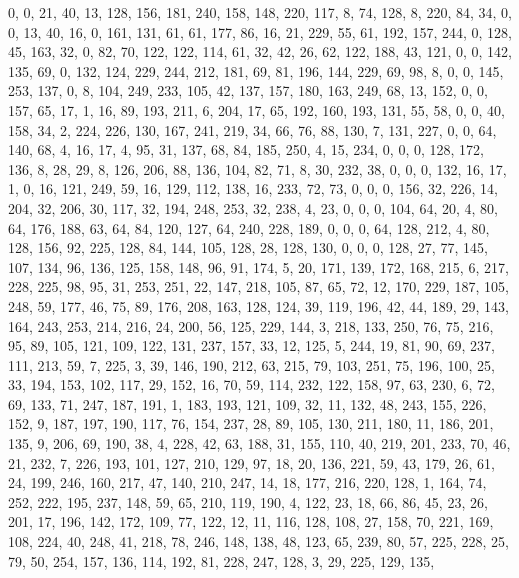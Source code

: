 \begin{DoxyCode}
       0, 0, 21, 40, 13, 128, 156, 181, 240, 158, 148, 220, 117, 8, 74, 128, 8, 220, 84, 34, 0, 0, 13, 40, 16, 0,
       161, 131, 61, 61, 177, 86, 16, 21, 229, 55, 61, 192, 157, 244, 0, 128, 45, 163, 32, 0, 82, 70, 122, 122,
       114, 61, 32, 42, 26, 62, 122, 188, 43, 121, 0, 0, 142, 135, 69, 0, 132, 124, 229, 244, 212, 181, 69, 81, 196,
       144, 229, 69, 98, 8, 0, 0, 145, 253, 137, 0, 8, 104, 249, 233, 105, 42, 137, 157, 180, 163, 249, 68, 13, 152,
       0, 0, 157, 65, 17, 1, 16, 89, 193, 211, 6, 204, 17, 65, 192, 160, 193, 131, 55, 58, 0, 0, 40, 158, 34, 2,
       224, 226, 130, 167, 241, 219, 34, 66, 76, 88, 130, 7, 131, 227, 0, 0, 64, 140, 68, 4, 16, 17, 4, 95, 31, 137,
       68, 84, 185, 250, 4, 15, 234, 0, 0, 0, 128, 172, 136, 8, 28, 29, 8, 126, 206, 88, 136, 104, 82, 71, 8, 30,
       232, 38, 0, 0, 0, 132, 16, 17, 1, 0, 16, 121, 249, 59, 16, 129, 112, 138, 16, 233, 72, 73, 0, 0, 0, 156, 32,
       226, 14, 204, 32, 206, 30, 117, 32, 194, 248, 253, 32, 238, 4, 23, 0, 0, 0, 104, 64, 20, 4, 80, 64, 176,
       188, 63, 64, 84, 120, 127, 64, 240, 228, 189, 0, 0, 0, 64, 128, 212, 4, 80, 128, 156, 92, 225, 128, 84, 144,
       105, 128, 28, 128, 130, 0, 0, 0, 128, 27, 77, 145, 107, 134, 96, 136, 125, 158, 148, 96, 91, 174, 5, 20, 171,
       139, 172, 168, 215, 6, 217, 228, 225, 98, 95, 31, 253, 251, 22, 147, 218, 105, 87, 65, 72, 12, 170, 229,
       187, 105, 248, 59, 177, 46, 75, 89, 176, 208, 163, 128, 124, 39, 119, 196, 42, 44, 189, 29, 143, 164, 243,
       253, 214, 216, 24, 200, 56, 125, 229, 144, 3, 218, 133, 250, 76, 75, 216, 95, 89, 105, 121, 109, 122, 131, 237,
       157, 33, 12, 125, 5, 244, 19, 81, 90, 69, 237, 111, 213, 59, 7, 225, 3, 39, 146, 190, 212, 63, 215, 79,
       103, 251, 75, 196, 100, 25, 33, 194, 153, 102, 117, 29, 152, 16, 70, 59, 114, 232, 122, 158, 97, 63, 230, 6,
       72, 69, 133, 71, 247, 187, 191, 1, 183, 193, 121, 109, 32, 11, 132, 48, 243, 155, 226, 152, 9, 187, 197, 190,
       117, 76, 154, 237, 28, 89, 105, 130, 211, 180, 11, 186, 201, 135, 9, 206, 69, 190, 38, 4, 228, 42, 63, 188,
       31, 155, 110, 40, 219, 201, 233, 70, 46, 21, 232, 7, 226, 193, 101, 127, 210, 129, 97, 18, 20, 136, 221, 59,
       43, 179, 26, 61, 24, 199, 246, 160, 217, 47, 140, 210, 247, 14, 18, 177, 216, 220, 128, 1, 164, 74, 252,
       222, 195, 237, 148, 59, 65, 210, 119, 190, 4, 122, 23, 18, 66, 86, 45, 23, 26, 201, 17, 196, 142, 172, 109,
       77, 122, 12, 11, 116, 128, 108, 27, 158, 70, 221, 169, 108, 224, 40, 248, 41, 218, 78, 246, 148, 138, 48, 123,
       65, 239, 80, 57, 225, 228, 25, 79, 50, 254, 157, 136, 114, 192, 81, 228, 247, 128, 3, 29, 225, 129, 135,

\end{DoxyCode}
